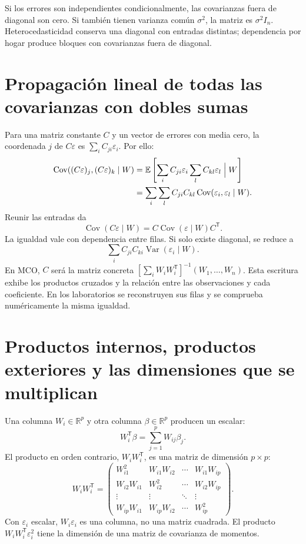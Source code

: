 \documentclass[11pt,a4paper]{article}
\newcommand{\E}{\mathbb E}
\DeclareMathOperator{\Var}{Var}
\DeclareMathOperator{\Cov}{Cov}
\begin{document}
Si los errores son independientes condicionalmente, las covarianzas fuera de diagonal son cero. Si también tienen varianza común $\sigma^2$, la matriz es $\sigma^2I_n$. Heterocedasticidad conserva una diagonal con entradas distintas; dependencia por hogar produce bloques con covarianzas fuera de diagonal.

\clearpage
\section{Propagación lineal de todas las covarianzas con dobles sumas}

Para una matriz constante $C$ y un vector de errores con media cero, la coordenada $j$ de $C\varepsilon$ es $\sum_iC_{ji}\varepsilon_i$. Por ello:
\[
\begin{aligned}
\Cov((C\varepsilon)_j,(C\varepsilon)_k\mid W)
&=\E\left[\sum_iC_{ji}\varepsilon_i
\sum_lC_{kl}\varepsilon_l\Bigm|W\right]\\
&=\sum_i\sum_lC_{ji}C_{kl}
\Cov(\varepsilon_i,\varepsilon_l\mid W).
\end{aligned}
\]
Reunir las entradas da
\[
\Cov(C\varepsilon\mid W)=C\Cov(\varepsilon\mid W)C^{\mathsf T}.
\]
La igualdad vale con dependencia entre filas. Si solo existe diagonal, se reduce a
\[
\sum_iC_{ji}C_{ki}\Var(\varepsilon_i\mid W).
\]
En MCO, $C$ será la matriz concreta
$[\sum_iW_iW_i^{\mathsf T}]^{-1}(W_1,\ldots,W_n)$.
Esta escritura exhibe los productos cruzados y la relación entre las observaciones y cada coeficiente. En los laboratorios se reconstruyen sus filas y se comprueba numéricamente la misma igualdad.

\clearpage
\section{Productos internos, productos exteriores y las dimensiones que se multiplican}

Una columna $W_i\in\mathbb R^p$ y otra columna $\beta\in\mathbb R^p$ producen un escalar:
\[
W_i^{\mathsf T}\beta=\sum_{j=1}^{p}W_{ij}\beta_j.
\]
El producto en orden contrario, $W_iW_i^{\mathsf T}$, es una matriz de dimensión $p\times p$:
\[
W_iW_i^{\mathsf T}
=\begin{pmatrix}
W_{i1}^2&W_{i1}W_{i2}&\cdots&W_{i1}W_{ip}\\
W_{i2}W_{i1}&W_{i2}^2&\cdots&W_{i2}W_{ip}\\
\vdots&\vdots&\ddots&\vdots\\
W_{ip}W_{i1}&W_{ip}W_{i2}&\cdots&W_{ip}^2
\end{pmatrix}.
\]
Con $\varepsilon_i$ escalar, $W_i\varepsilon_i$ es una columna, no una matriz cuadrada. El producto $W_iW_i^{\mathsf T}\varepsilon_i^2$ tiene la dimensión de una matriz de covarianza de momentos.
\end{document}
